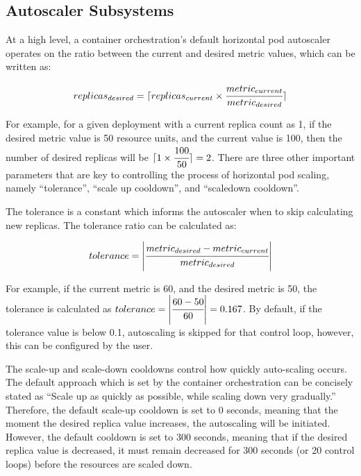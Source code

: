 \subsection{Autoscaler Subsystems}
\label{subsec:ch4-hybrid-arch}

At a high level, a container orchestration's default horizontal pod autoscaler operates on the ratio between the current and desired metric values, which can be written as:

\begin{equation}
    replicas_{desired} = \lceil replicas_{current} \times \cfrac{metric_{current}}{metric_{desired}}\rceil
    \label{eqn:replica-desired}
\end{equation}

For example, for a given deployment with a current replica count as 1, if the desired metric value is 50 resource units, and the current value is 100, then the number of desired replicas will be $\lceil 1 \times \cfrac{100}{50}\rceil = 2$. There are three other important parameters that are key to controlling the process of horizontal pod scaling, namely ``tolerance'', ``scale up cooldown'', and ``scaledown cooldown''.\par

The tolerance is a constant which informs the autoscaler when to skip calculating new replicas. The tolerance ratio can be calculated as:

\begin{equation}
    \label{eqn:tolerance}
    tolerance = \abs{ \cfrac{metric_{desired} - metric_{current}}{metric_{desired}} }
\end{equation}

For example, if the current metric is 60, and the desired metric is 50, the tolerance is calculated as $ tolerance = \abs{ \cfrac{60 - 50}{60}} = 0.167$. By default, if the tolerance value is below 0.1, autoscaling is skipped for that control loop, however, this can be configured by the user.\par

The scale-up and scale-down cooldowns control how quickly auto-scaling occurs. The default approach which is set by the container orchestration can be concisely stated as ``Scale up as quickly as possible, while scaling down very gradually.'' Therefore, the default scale-up cooldown is set to 0 seconds, meaning that the moment the desired replica value increases, the autoscaling will be initiated. However, the default cooldown is set to 300 seconds, meaning that if the desired replica value is decreased, it must remain decreased for 300 seconds (or 20 control loops) before the resources are scaled down.\par

